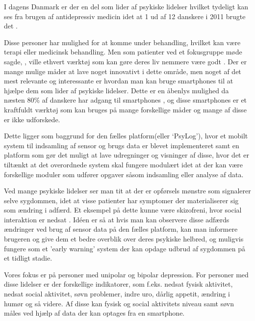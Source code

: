 I dagens Danmark er der en del som lider af psykiske lidelser hvilket tydeligt kan ses fra brugen af antidepressiv medicin idet at 1 ud af 12 danskere i 2011 brugte det \citep{misc:forbrugAntidepressiva}. 

Disse personer har mulighed for at komme under behandling, hvilket kan være terapi eller medicinsk behandling.
Men som patienter ved et fokusgruppe møde sagde, \citep[Kapitel 1, Sektion 5]{misc:faellesrapp}, ville ethvert værktøj som kan gøre deres liv nemmere være godt .
Der er mange mulige måder at lave noget innovativt i dette område, men noget af det mest relevante og interessante er hvordan man kan bruge smartphones til at hjælpe dem som lider af psykiske lidelser.
Dette er en åbenlys mulighed da næsten 80\% af danskere har adgang til smartphones \citep{misc:dstElektronik}, og disse smartphones er et kraftfuldt værktøj som kan bruges på mange forskellige måder og mange af disse er ikke udforskede.

Dette ligger som baggrund for den fælles platform(eller `PsyLog')\citep{misc:faellesrapp}, hvor et mobilt system til indsamling af sensor og brugs data er blevet implementeret samt en platform som gør det muligt at lave udregninger og visninger af disse, hvor det er tiltænkt at det overordnede system skal fungere modulært idet at der kan være forskellige moduler som udfører opgaver såsom indsamling eller analyse af data.

Ved mange psykiske lidelser ser man tit at der er opførsels mønstre som signalerer selve sygdommen, idet at visse patienter har symptomer der materialiserer sig som ændring i adfærd.
Et eksempel på dette kunne være skizofreni, hvor social interaktion er nedsat \citep{misc:negativeSymptomsSchizo}.
Idéen er så at hvis man kan observere disse adfærds ændringer ved brug af sensor data på den fælles platform, kan man informere brugeren og give dem et bedre overblik over deres psykiske helbred, og muligvis fungere som et 'early warning' system der kan opdage udbrud af sygdommen på et tidligt stadie.

Vores fokus er på personer med unipolar og bipolar depression. 
For personer med disse lidelser er der forskellige indikatorer, som f.eks. nedsat fysisk aktivitet, nedsat social aktivitet, søvn problemer, indre uro, dårlig appetit, ændring i humør og så videre\citep{misc:faellesrapp}.
Af disse kan fysisk og social aktivitets niveau samt søvn måles ved hjælp af data der kan optages fra en smartphone.

